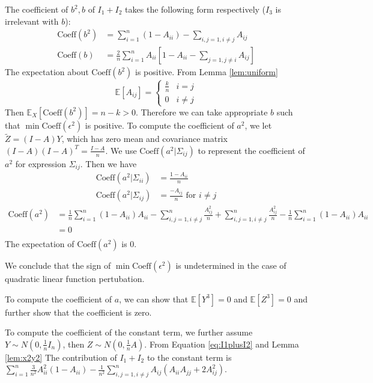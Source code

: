 \documentclass{article}
\def\E{\mathbb{E}}
\begin{document}
The coefficient of $b^2, b$ of $I_1 + I_2$ takes the following form respectively ($I_3$ is irrelevant with $b$):
\begin{align*}
\textrm{Coeff}(b^2) & = \sum_{i=1}^n (1-A_{ii}) - \sum_{i,j=1, i\neq j} A_{ij} \\
\textrm{Coeff}(b) & = \frac{2}{n}\sum_{i=1}^n A_{ii} [ 1 - A_{ii} - \sum_{j=1, j\neq i} A_{ij} ]
\end{align*}
The expectation about $\textrm{Coeff}(b^2)$ is positive. From Lemma \ref{lem:uniform}
$$
\E[A_{ij}]= \begin{cases}
\frac{k}{n} & i = j\\
0 & i\neq j 
\end{cases}
$$
Then $\E_X[\textrm{Coeff}(b^2)]  = n-k > 0$. 
Therefore we can take appropriate $b$ such that $\min \textrm{Coeff}(\epsilon^2)$ is positive.
To compute the coefficient of $a^2$, we let $\widetilde{Z}=(I-A)Y$, which has zero mean and covariance matrix $(I-A)(I-A)^T = \frac{I-A}{n}$.  We use $\textrm{Coeff}(a^2 | \Sigma_{ij})$ to represent the coefficient of $a^2$ for expression $\Sigma_{ij}$. Then  we have
\begin{align*}
\textrm{Coeff}(a^2 | \Sigma_{ii}) & = \frac{1-A_{ii}}{n} \\
\textrm{Coeff}(a^2 | \Sigma_{ij}) & = \frac{-A_{ij}}{n}  \textrm{ for } i \neq j
\end{align*}
\begin{align*}
\textrm{Coeff}(a^2) & = \frac{1}{n}\sum_{i=1}^n (1-A_{ii})A_{ii}  - \sum_{i,j=1, i\neq j}^n \frac{A_{ij}^2}{n} + \sum_{i,j=1, i \neq j}^n \frac{A^2_{ij}}{n} - \frac{1}{n}\sum_{i=1}^n (1-A_{ii})A_{ii} \\
& = 0\\
\end{align*}
The expectation of $\textrm{Coeff}(a^2)$ is 0.

We conclude that the sign of $\min \textrm{Coeff}(\epsilon^2)$ is undetermined in the case of quadratic linear function pertubation.

To compute the coefficient of $a$, we can show that $\E[Y^3]=0$  and $\E[Z^3]=0$ and further show that the coefficient is zero.

To compute the coefficient of the constant term, we further assume $Y \sim N(0, \frac{1}{n}I_n)$, then $Z \sim N(0, \frac{1}{n}A)$. From Equation \eqref{eq:I1plusI2} and Lemma \ref{lem:x2y2} The contribution of $I_1+ I_2$ to the constant term is 
$ \sum_{i=1}^ n \frac{3}{n^2} A_{ii}^2 (1-A_{ii}) - \frac{1}{n^2} \sum_{i,j=1, i\neq j}^n A_{ij}(A_{ii}A_{jj}+2A_{ij}^2)$.
\end{document}
